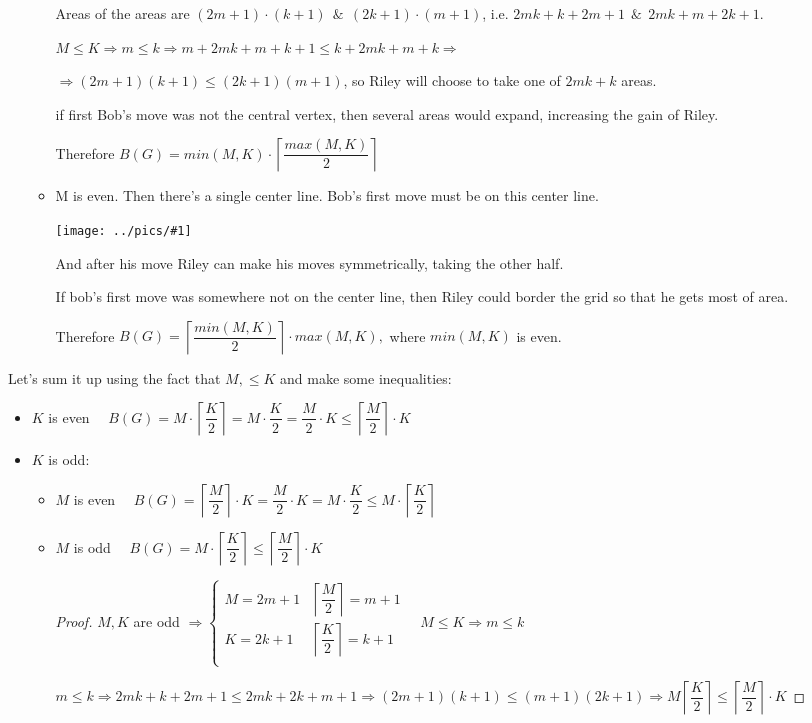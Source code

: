 \documentclass[12pt,a4paper, flushleft]{article}
\newcommand{\gr}[1]{\texttt{[image: ../pics/\#1]}}
\newcommand{\ceil}[1]{\left\lceil #1 \right\rceil}
\begin{document}
\begin{itemize}
\begin{itemize}
			Areas of the areas are $(2m+1)\cdot (k+1) ~~\&~~ (2k+1)\cdot (m+1)$, i.e. $2mk+k + 2m + 1~~\&~~ 2mk + m + 2k + 1$. 
			
			$M\leqslant K\Rightarrow m\leqslant k\Rightarrow m + 2mk + m + k + 1\leqslant  k + 2mk + m + k\Rightarrow $
			
			$\Rightarrow (2m+1)(k+1)\leqslant (2k+1)(m+1)$, so Riley will choose to take one of  $2mk + k$ areas. 
			
			if first Bob's move was not the central vertex, then several areas would expand, increasing the gain of Riley.
			
			Therefore $B(G) = min(M, K)\cdot \ceil{\dfrac{max(M, K)}{2}}$
			
			\item M is even. Then there's a single center line. Bob's first move must be on this center line.
			
			\gr{b3}
			
			And after his move Riley can make his moves symmetrically, taking the other half.
			
			If bob's first move was somewhere not on the center line, then Riley could border the grid so that he gets most of area.
			
			Therefore $B(G) = \ceil{\dfrac{min(M, K)}{2}}\cdot max(M, K),$ where $min(M, K)$ is even.
		\end{itemize}
	\end{itemize}
	
	
	
	Let's sum it up using the fact that $M,\leqslant K$ and make some inequalities:
	\begin{itemize}
		\item $K$ is even $\quad B(G) = M \cdot \ceil{\dfrac{K}{2}} = M\cdot \dfrac{K}{2}  = \dfrac{M}{2}\cdot K\leqslant \ceil{\dfrac{M}{2}}\cdot K$
		\item $K$ is odd:
		\begin{itemize}
			\item $M$ is even $\quad B(G) = \ceil{\dfrac{M}{2}}\cdot K = \dfrac{M}{2}\cdot K = M\cdot \dfrac{K}{2}\leqslant M\cdot \ceil{\dfrac{K}{2}}$	
			\item $M$ is odd $\quad B(G) = M\cdot \ceil{\dfrac{K}{2}}\leqslant \ceil{\dfrac{M}{2}}\cdot K$
			\begin{proof}
				$M, K$ are odd $\Rightarrow \begin{cases} M = 2m+1 & \ceil{\dfrac{M}{2}} = m+1\\K = 2k+1& \ceil{\dfrac{K}{2}} = k+1\\ \end{cases}\quad M\leqslant K\Rightarrow m\leqslant k$
				
				$m\leqslant k\Rightarrow 2mk + k + 2m + 1\leqslant 2mk + 2k + m + 1\Rightarrow (2m+1)(k+1)\leqslant (m+1)(2k+1) \Rightarrow M\ceil{\dfrac{K}{2}}\leqslant \ceil{\dfrac{M}{2}}\cdot K$
			\end{proof}
		\end{itemize}		 
	\end{itemize}
	
\end{document}
